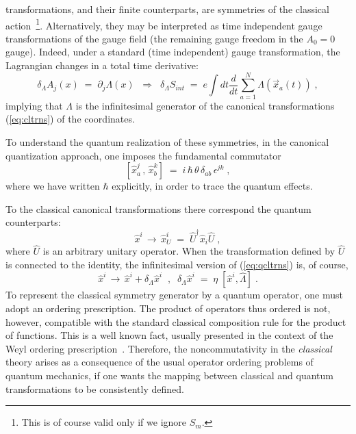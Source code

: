\documentclass[a4paper,12pt]{article}
\begin{document}
transformations, and their finite counterparts, are symmetries of
the
classical action~\footnote{This is of course valid only if we
ignore
  $S_m$.}. Alternatively, they may be interpreted as time
independent
gauge transformations of the gauge field (the remaining gauge
freedom
in the $A_0=0$ gauge).  Indeed, under a standard (time independent)
gauge transformation, the Lagrangian changes in a total time
derivative:
\begin{equation}
  \label{eq:gtc}
\delta_\Lambda A_j (x) \;=\; \partial_j \Lambda (x)
\;\;\Rightarrow\;\;
\delta_\Lambda S_{int} \;=\; e \int dt \frac{d}{dt} \sum_{a=1}^N
\Lambda({\vec x}_a(t)) \;,
\end{equation}
implying that $\Lambda$ is the infinitesimal generator of the
canonical
transformations (\ref{eq:cltrns}) of the coordinates.

To understand the quantum realization of these symmetries, in the
canonical quantization approach, one imposes the fundamental
commutator
\begin{equation} 
 \label{eq:qcs}
[ {\hat x}^j_a \,,\, {\hat x}^k_b ] \;=\; i \,\hbar \,\theta
\,\delta_{ab} \,
\epsilon^{jk} \;,
\end{equation}
where we have written $\hbar$ explicitly, in order to trace the
quantum
effects.
 
To the classical canonical transformations there correspond the
quantum counterparts:
\begin{equation} 
 \label{eq:qcltrns}
{\hat x}^i \,\to\, {\hat x}^i_U \;=\; {\hat U}^\dagger {\hat x}_i
\hat U \;,
\end{equation}
where ${\hat U}$ is an arbitrary unitary operator. When the
transformation defined by ${\hat U}$ is connected to the identity,
the
infinitesimal version of (\ref{eq:qcltrns}) is, of course,
\begin{equation}
  \label{eq:qcltrns1}
{\hat x}^i \,\to\, {\hat x}^i + \delta_\Lambda {\hat x}^i \;\;,\;\;
\delta_\Lambda{\hat x}^i 
\;=\; \eta \; [ {\hat x}^i, {\hat \Lambda}] \;.
\end{equation}
To represent the classical symmetry generator by a quantum
operator,
one must adopt an ordering prescription. The product of operators
thus
ordered is not, however, compatible with the standard classical
composition rule for the product of functions. This is a well known
fact, usually presented in the context of the Weyl ordering
prescription~\cite{QG}.  Therefore, the noncommutativity in the
{\em
  classical\/} theory arises as a consequence of the usual operator
ordering problems of quantum mechanics, if one wants the mapping
between classical and quantum transformations to be consistently
defined.
\end{document}
